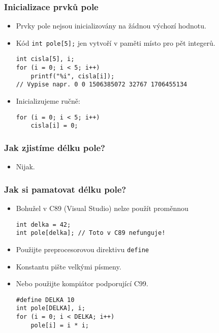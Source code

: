 \documentclass{beamer}
\newenvironment{itemizex}%
  {\large \begin{itemize}%
    \setlength{\itemsep}{8pt}%
    \setlength{\parskip}{8pt}}%
  {\end{itemize}}
\begin{document}
\begin{frame}[t,fragile]\frametitle{Inicializace prvků pole} 
  \begin{itemizex}
    \item Prvky pole nejsou inicializovány na žádnou výchozí hodnotu.
    \item Kód \texttt{int pole[5];} jen vytvoří v paměti místo pro pět integerů.
    \begin{verbatim} 
int cisla[5], i;
for (i = 0; i < 5; i++) 
    printf("%i", cisla[i]);
// Vypise napr. 0 0 1506385072 32767 1706455134
    \end{verbatim}
    \item Inicializujeme ručně:
    \begin{verbatim} 
for (i = 0; i < 5; i++) 
    cisla[i] = 0;
    \end{verbatim}
  \end{itemizex}
\end{frame}


\begin{frame}[t,fragile]\frametitle{Jak zjistíme délku pole?} 
    \begin{itemizex}
        \item Nijak.
    \end{itemizex}
\end{frame}


\begin{frame}[t,fragile]\frametitle{Jak si pamatovat délku pole?} 
    \begin{itemize}
        \item Bohužel v C89 (Visual Studio) nelze použít proměnnou
        \begin{verbatim} 
int delka = 42;
int pole[delka]; // Toto v C89 nefunguje!
        \end{verbatim}
        \item Použijte preprocesorovou direktivu \texttt{define}
        \item Konstantu pište velkými písmeny.
        \item Nebo použijte kompiátor podporující C99.
        \begin{verbatim} 
#define DELKA 10
int pole[DELKA], i;
for (i = 0; i < DELKA; i++) 
    pole[i] = i * i;
        \end{verbatim}
    \end{itemize}
\end{frame}
\end{document}
